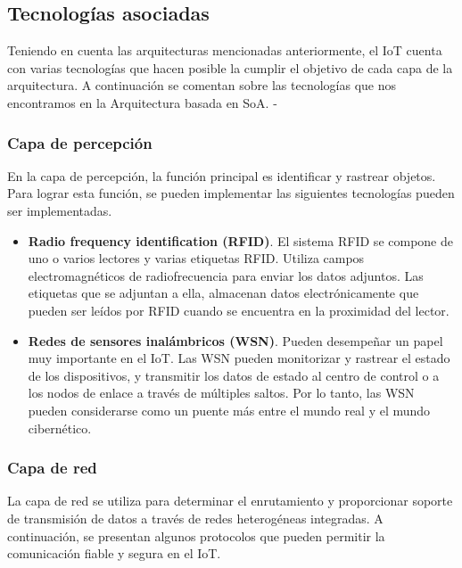 {\subsection{Tecnologías asociadas}

Teniendo en cuenta las arquitecturas mencionadas anteriormente, el IoT cuenta con varias tecnologías que hacen posible la cumplir el objetivo de cada capa de la arquitectura. A continuación se comentan sobre las tecnologías que nos encontramos en la Arquitectura basada en SoA. \cite{lin2017survey}-\cite{tripathy2017internet}

\subsubsection{Capa de percepción}

En la capa de percepción, la función principal es identificar y rastrear objetos. Para lograr esta función, se pueden implementar las siguientes tecnologías pueden ser implementadas.

\begin{itemize}
    \item \textbf{Radio frequency identification (RFID)}. El sistema RFID se compone de uno o varios lectores y varias etiquetas RFID. Utiliza campos electromagnéticos de radiofrecuencia para enviar los datos adjuntos. Las etiquetas que se adjuntan a ella, almacenan datos electrónicamente que pueden ser leídos por RFID cuando se encuentra en la proximidad del lector. \cite{7589556}
    \item \textbf{Redes de sensores inalámbricos (WSN)}. Pueden desempeñar un papel muy importante en el IoT. Las WSN pueden monitorizar y rastrear el estado de los dispositivos, y transmitir los datos de estado al centro de control o a los nodos de enlace a través de múltiples saltos. Por lo tanto, las WSN pueden considerarse como un puente más entre el mundo real y el mundo cibernético. \cite{lin2017survey}
\end{itemize}

\subsubsection{Capa de red}

La capa de red se utiliza para determinar el enrutamiento y proporcionar soporte de transmisión de datos a través de redes heterogéneas integradas. A continuación, se presentan algunos protocolos que pueden permitir la comunicación fiable y segura en el IoT. \cite{lin2017survey}

}
